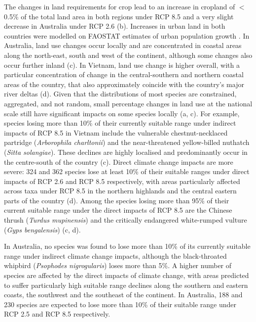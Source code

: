 The changes in land requirements for crop lead to an increase in cropland of $<$ 0.5\% of the total land area in both regions under RCP 8.5 and a very slight decrease in Australia under RCP 2.6 (b). Increases in urban land in both countries were modelled on FAOSTAT estimates of urban population growth \citep{fao_faostat_2017}. In Australia, land use changes occur locally and are concentrated in coastal areas along the north-east, south and west of the continent, although some changes also occur further inland (c). In Vietnam, land use change is higher overall, with a particular concentration of change in the central-southern and northern coastal areas of the country, that also approximately coincide with the country’s major river deltas (d). Given that the distributions of most species are constrained, aggregated, and not random, small percentage changes in land use at the national scale still have significant impacts on some species locally (a, c). For example, species losing more than 10\% of their currently suitable range under indirect impacts of RCP 8.5 in Vietnam include the vulnerable chestnut-necklaced partridge (\textit{Arborophila charltonii}) and the near-threatened yellow-billed nuthatch (\textit{Sitta solangiae}). These declines are highly localised and predominantly occur in the centre-south of the country (c). Direct climate change impacts are more severe: 324 and 362 species lose at least 10\% of their suitable ranges under direct impacts of RCP 2.6 and RCP 8.5 respectively, with areas particularly affected across taxa under RCP 8.5 in the northern highlands and the central eastern parts of the country (d). Among the species losing more than 95\% of their current suitable range under the direct impacts of RCP 8.5 are the Chinese thrush (\textit{Turdus mupinensis}) and the critically endangered white-rumped vulture (\textit{Gyps bengalensis}) (c, d).

In Australia, no species was found to lose more than 10\% of its currently suitable range under indirect climate change impacts, although the black-throated whipbird (\textit{Psophodes nigrogularis}) loses more than 5\%. A higher number of species are affected by the direct impacts of climate change, with areas predicted to suffer particularly high suitable range declines along the southern and eastern coasts, the southwest and the southeast of the continent. In Australia, 188 and 230 species are expected to lose more than 10\% of their suitable range under RCP 2.5 and RCP 8.5 respectively.

